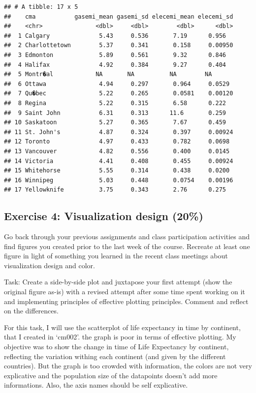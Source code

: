 \documentclass[]{article}
\begin{document}
\begin{verbatim}
## # A tibble: 17 x 5
##    cma           gasemi_mean gasemi_sd elecemi_mean elecemi_sd
##    <chr>               <dbl>     <dbl>        <dbl>      <dbl>
##  1 Calgary              5.43     0.536       7.19      0.956  
##  2 Charlottetown        5.37     0.341       0.158     0.00950
##  3 Edmonton             5.89     0.561       9.32      0.846  
##  4 Halifax              4.92     0.384       9.27      0.404  
##  5 Montr�al            NA       NA          NA        NA      
##  6 Ottawa               4.94     0.297       0.964     0.0529 
##  7 Qu�bec               5.22     0.265       0.0581    0.00120
##  8 Regina               5.22     0.315       6.58      0.222  
##  9 Saint John           6.31     0.313      11.6       0.259  
## 10 Saskatoon            5.27     0.365       7.67      0.459  
## 11 St. John's           4.87     0.324       0.397     0.00924
## 12 Toronto              4.97     0.433       0.782     0.0698 
## 13 Vancouver            4.82     0.556       0.400     0.0145 
## 14 Victoria             4.41     0.408       0.455     0.00924
## 15 Whitehorse           5.55     0.314       0.438     0.0200 
## 16 Winnipeg             5.03     0.448       0.0754    0.00196
## 17 Yellowknife          3.75     0.343       2.76      0.275
\end{verbatim}

\hypertarget{exercise-4-visualization-design-20}{%
\subsection{Exercise 4: Visualization design
(20\%)}\label{exercise-4-visualization-design-20}}

Go back through your previous assignments and class participation
activities and find figures you created prior to the last week of the
course. Recreate at least one figure in light of something you learned
in the recent class meetings about visualization design and color.

Task: Create a side-by-side plot and juxtapose your first attempt (show
the original figure as-is) with a revised attempt after some time spent
working on it and implementing principles of effective plotting
principles. Comment and reflect on the differences.

For this task, I will use the scatterplot of life expectancy in time by
continent, that I created in `cm002'. the graph is poor in terms of
effective plotting. My objective was to show the change in time of Life
Expectancy by continent, reflecting the variation withing each continent
(and given by the different countries). But the graph is too crowded
with information, the colors are not very explicative and the population
size of the datapoints doesn't add more informations. Also, the axis
names should be self explicative.
\end{document}
